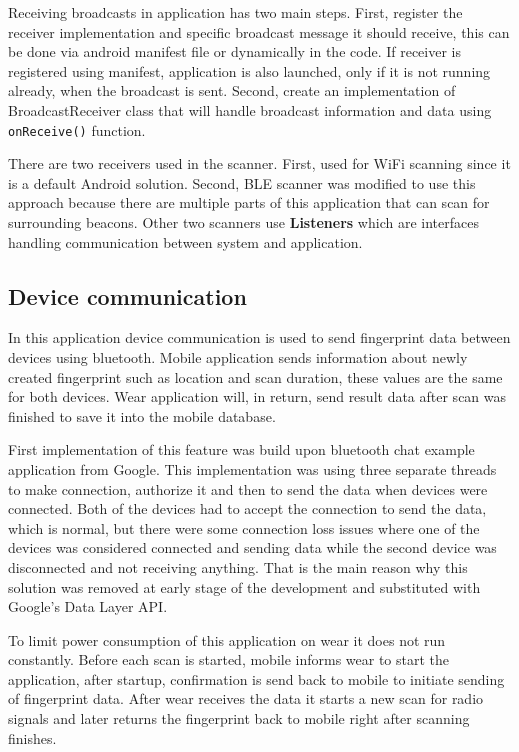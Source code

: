 Receiving broadcasts in application has two main steps. First, register the receiver implementation and specific broadcast message it should receive, this can be done via android manifest file or dynamically in the code. If receiver is registered using manifest, application is also launched, only if it is not running already, when the broadcast is sent. Second, create an implementation of BroadcastReceiver class that will handle broadcast information and data using \verb|onReceive()| function.

There are two receivers used in the scanner. First, used for WiFi scanning since it is a default Android solution. Second, BLE scanner was modified to use this approach because there are multiple parts of this application that can scan for surrounding beacons. Other two scanners use \textbf{Listeners} which are interfaces handling communication between system and application.

\subsection{Device communication}\label{subsec:DeviceCommunication}
In this application device communication is used to send fingerprint data between devices using bluetooth. Mobile application sends information about newly created fingerprint such as location and scan duration, these values are the same for both devices. Wear application will, in return, send result data after scan was finished to save it into the mobile database.

First implementation of this feature was build upon bluetooth chat example application from Google. This implementation was using three separate threads to make connection, authorize it and then to send the data when devices were connected. Both of the devices had to accept the connection to send the data, which is normal, but there were some connection loss issues where one of the devices was considered connected and sending data while the second device was disconnected and not receiving anything. That is the main reason why this solution was removed at early stage of the development and substituted with Google's Data Layer API.

To limit power consumption of this application on wear it does not run constantly. Before each scan is started, mobile informs wear to start the application, after startup, confirmation is send back to mobile to initiate sending of fingerprint data. After wear receives the data it starts a new scan for radio signals and later returns the fingerprint back to mobile right after scanning finishes.

